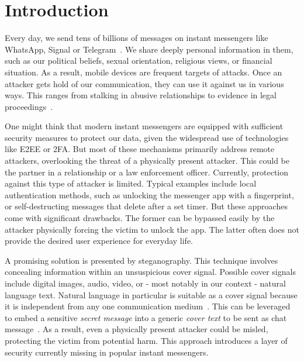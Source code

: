 
\chapter{Introduction}\label{ch:introduction}
\glsresetall %


Every day, we send tens of billions of messages on instant messengers like WhatsApp, Signal or Telegram~\cite{smithMillionWhatsAppMessages2018}. We share deeply personal information in them, such as our political beliefs, sexual orientation, religious views, or financial situation. As a result, mobile devices are frequent targets of attacks. Once an attacker gets hold of our communication, they can use it against us in various ways. This ranges from stalking in abusive relationships to evidence in legal proceedings~\cite{obrienNebraskaTeenMother2022,mackeyFrenchScientistDenied2025}.

One might think that modern instant messengers are equipped with sufficient security measures to protect our data, given the widespread use of technologies like \gls{E2EE} or \gls{2FA}. But most of these mechanisms primarily address remote attackers, overlooking the threat of a physically present attacker. This could be the partner in a relationship or a law enforcement officer. Currently, protection against this type of attacker is limited. Typical examples include local authentication methods, such as unlocking the messenger app with a fingerprint, or self-destructing messages that delete after a set timer. But these approaches come with significant drawbacks. The former can be bypassed easily by the attacker physically forcing the victim to unlock the app. The latter often does not provide the desired user experience for everyday life.

A promising solution is presented by steganography. This technique involves concealing information within an unsuspicious cover signal. Possible cover signals include digital images, audio, video, or - most notably in our context - natural language text. Natural language in particular is suitable as a cover signal because it is independent from any one communication medium~\cite{zieglerNeuralLinguisticSteganography2019}. This can be leveraged to embed a sensitive \textit{secret message} into a generic \textit{cover text} to be sent as chat message~\cite{zieglerNeuralLinguisticSteganography2019}. As a result, even a physically present attacker could be misled, protecting the victim from potential harm. This approach introduces a layer of security currently missing in popular instant messengers.

